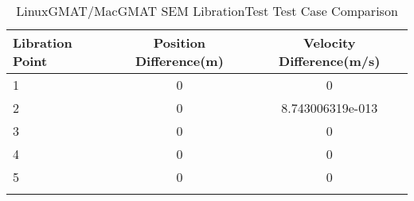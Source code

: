 \begin{table}[htbp!]
\centering
\caption{ LinuxGMAT/MacGMAT SEM LibrationTest Test Case Comparison}
      \begin{tabular}{lcc}
      \hline\hline
          Libration Point & Position Difference(m) & Velocity Difference(m/s) \\
         \hline
         1 & 0 & 0 \\
         2 & 0 & 8.743006319e-013 \\
         3 & 0 & 0 \\
         4 & 0 & 0 \\
         5 & 0 & 0 \\
      \hline\hline
      \label{Table: LinuxGMAT-MacGMAT SEM LibrationTest Table} 
\end{tabular}
\end{table}
